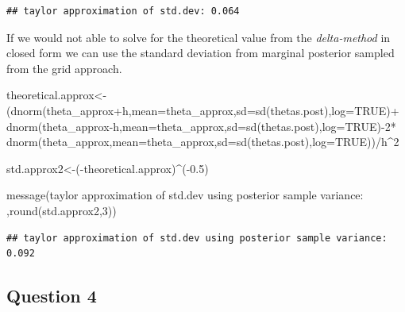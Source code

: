 \documentclass[
]{book}
\newenvironment{Shaded}{\begin{snugshade}}{\end{snugshade}}
\newcommand{\AttributeTok}[1]{\textcolor[rgb]{0.77,0.63,0.00}{#1}}
\newcommand{\ConstantTok}[1]{\textcolor[rgb]{0.00,0.00,0.00}{#1}}
\newcommand{\DecValTok}[1]{\textcolor[rgb]{0.00,0.00,0.81}{#1}}
\newcommand{\FloatTok}[1]{\textcolor[rgb]{0.00,0.00,0.81}{#1}}
\newcommand{\FunctionTok}[1]{\textcolor[rgb]{0.00,0.00,0.00}{#1}}
\newcommand{\NormalTok}[1]{#1}
\newcommand{\OtherTok}[1]{\textcolor[rgb]{0.56,0.35,0.01}{#1}}
\newcommand{\SpecialCharTok}[1]{\textcolor[rgb]{0.00,0.00,0.00}{#1}}
\newcommand{\StringTok}[1]{\textcolor[rgb]{0.31,0.60,0.02}{#1}}
\theoremstyle{definition}
\theoremstyle{definition}
\theoremstyle{definition}
\theoremstyle{definition}
\theoremstyle{remark}
\begin{document}
\begin{verbatim}
## taylor approximation of std.dev: 0.064
\end{verbatim}

If we would not able to solve for the theoretical value from the \emph{delta-method} in closed form we can use the standard deviation from marginal posterior sampled from the grid approach.

\begin{Shaded}
\begin{Highlighting}[]
\NormalTok{theoretical.approx}\OtherTok{\textless{}{-}}\NormalTok{(}\FunctionTok{dnorm}\NormalTok{(theta\_approx}\SpecialCharTok{+}\NormalTok{h,}\AttributeTok{mean=}\NormalTok{theta\_approx,}\AttributeTok{sd=}\FunctionTok{sd}\NormalTok{(thetas.post),}\AttributeTok{log=}\ConstantTok{TRUE}\NormalTok{)}\SpecialCharTok{+}  \FunctionTok{dnorm}\NormalTok{(theta\_approx}\SpecialCharTok{{-}}\NormalTok{h,}\AttributeTok{mean=}\NormalTok{theta\_approx,}\AttributeTok{sd=}\FunctionTok{sd}\NormalTok{(thetas.post),}\AttributeTok{log=}\ConstantTok{TRUE}\NormalTok{)}\SpecialCharTok{{-}}\DecValTok{2}\SpecialCharTok{*}  \FunctionTok{dnorm}\NormalTok{(theta\_approx,}\AttributeTok{mean=}\NormalTok{theta\_approx,}\AttributeTok{sd=}\FunctionTok{sd}\NormalTok{(thetas.post),}\AttributeTok{log=}\ConstantTok{TRUE}\NormalTok{))}\SpecialCharTok{/}\NormalTok{h}\SpecialCharTok{\^{}}\DecValTok{2}

\NormalTok{std.approx2}\OtherTok{\textless{}{-}}\NormalTok{(}\SpecialCharTok{{-}}\NormalTok{theoretical.approx)}\SpecialCharTok{\^{}}\NormalTok{(}\SpecialCharTok{{-}}\FloatTok{0.5}\NormalTok{)}

 \FunctionTok{message}\NormalTok{(}\StringTok{\textquotesingle{}taylor approximation of std.dev using posterior sample variance: \textquotesingle{}}\NormalTok{,}\FunctionTok{round}\NormalTok{(std.approx2,}\DecValTok{3}\NormalTok{))}
\end{Highlighting}
\end{Shaded}

\begin{verbatim}
## taylor approximation of std.dev using posterior sample variance: 0.092
\end{verbatim}

\hypertarget{question-4-1}{%
\subsection*{Question 4}\label{question-4-1}}
\end{document}
